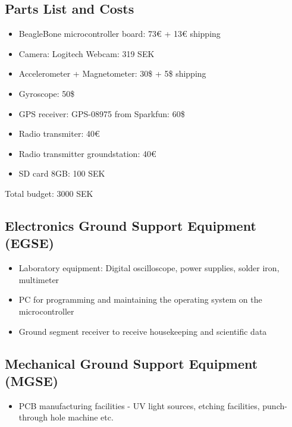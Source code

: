 \documentclass[fontsize=11pt,paper=a4,]{scrartcl}
\begin{document}
\subsection{Parts List and Costs}
\begin{itemize}
\item BeagleBone microcontroller board: 73€ + 13€ shipping
\item Camera: Logitech Webcam: 319 SEK
\item Accelerometer + Magnetometer: 30\$ + 5\$ shipping
\item Gyroscope: 50\$
\item GPS receiver: GPS-08975 from Sparkfun: 60\$
\item Radio transmiter: 40€
\item Radio transmitter groundstation: 40€
\item SD card 8GB: 100 SEK
\end{itemize}
Total budget: 3000 SEK

\subsection{Electronics Ground Support Equipment (EGSE)}
\begin{itemize}
\item Laboratory equipment: Digital oscilloscope, power supplies, solder iron, multimeter
\item PC for programming and maintaining the operating system on the microcontroller
\item Ground segment receiver to receive housekeeping and scientific data
\end{itemize}

\subsection{Mechanical Ground Support Equipment (MGSE)}
\begin{itemize}
\item PCB manufacturing facilities - UV light sources, etching facilities, punch-through hole machine etc.
\end{itemize}


\newpage
\printbibliography
{}
\pagestyle{plain}
\end{document}
